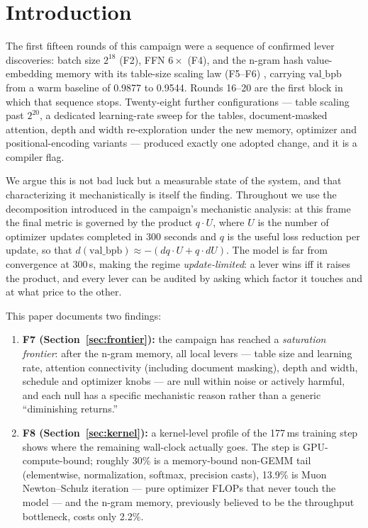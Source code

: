 \documentclass{article}
\newcommand{\valbpb}{\mathrm{val\_bpb}}
\begin{document}
\section{Introduction}
\label{sec:intro}

The first fifteen rounds of this campaign were a sequence of confirmed lever discoveries: batch size $2^{18}$ (F2), FFN $6\times$ (F4), and the n-gram hash value-embedding memory with its table-size scaling law (F5--F6) \cite{ophis2026paper001,ophis2026paper002,ophis2026paper003}, carrying $\valbpb$ from a warm baseline of 0.9877 to 0.9544. Rounds 16--20 are the first block in which that sequence stops. Twenty-eight further configurations --- table scaling past $2^{20}$, a dedicated learning-rate sweep for the tables, document-masked attention, depth and width re-exploration under the new memory, optimizer and positional-encoding variants --- produced exactly one adopted change, and it is a compiler flag.

We argue this is not bad luck but a measurable state of the system, and that characterizing it mechanistically is itself the finding. Throughout we use the decomposition introduced in the campaign's mechanistic analysis: at this frame the final metric is governed by the product $q \cdot U$, where $U$ is the number of optimizer updates completed in 300 seconds and $q$ is the useful loss reduction per update, so that $d(\valbpb) \approx -(dq \cdot U + q \cdot dU)$. The model is far from convergence at 300\,s, making the regime \emph{update-limited}: a lever wins iff it raises the product, and every lever can be audited by asking which factor it touches and at what price to the other.

This paper documents two findings:

\begin{enumerate}
    \item \textbf{F7 (Section~\ref{sec:frontier}):} the campaign has reached a \emph{saturation frontier}: after the n-gram memory, all local levers --- table size and learning rate, attention connectivity (including document masking), depth and width, schedule and optimizer knobs --- are null within noise or actively harmful, and each null has a specific mechanistic reason rather than a generic ``diminishing returns.''
    \item \textbf{F8 (Section~\ref{sec:kernel}):} a kernel-level profile of the 177\,ms training step shows where the remaining wall-clock actually goes. The step is GPU-compute-bound; roughly 30\% is a memory-bound non-GEMM tail (elementwise, normalization, softmax, precision casts), 13.9\% is Muon Newton--Schulz iteration --- pure optimizer FLOPs that never touch the model --- and the n-gram memory, previously believed to be the throughput bottleneck, costs only 2.2\%.
\end{enumerate}
\end{document}
